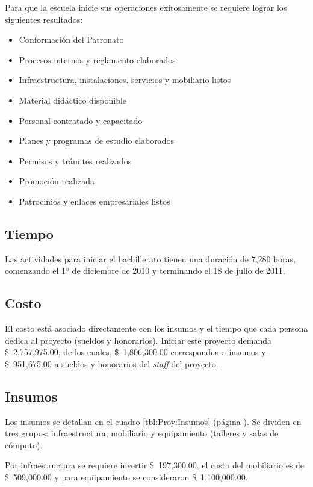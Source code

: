 Para que la escuela inicie sus operaciones exitosamente se requiere lograr los siguientes resultados:

\begin{itemize}
	\item Conformación del Patronato
	\item Procesos internos y reglamento elaborados
	\item Infraestructura, instalaciones. servicios y mobiliario listos
	\item Material didáctico disponible
	\item Personal contratado y capacitado
	\item Planes y programas de estudio elaborados
	\item Permisos y trámites realizados
	\item Promoción realizada
	\item Patrocinios y enlaces empresariales listos
\end{itemize}

\subsection{Tiempo}

Las actividades para iniciar el bachillerato tienen una duración de 7,280 horas, comenzando el 1º de diciembre de 2010 y terminando el 18 de julio  de 2011.

\subsection{Costo}
\label{sub:Proy:Costo}

El costo está asociado directamente con los insumos y el tiempo que cada persona dedica al proyecto (sueldos y honorarios). Iniciar este proyecto demanda \$~2,757,975.00; de los cuales, \$~1,806,300.00 corresponden a insumos y \$~951,675.00 a sueldos y honorarios del \emph{staff} del proyecto.

\subsection{Insumos}

Los insumos se detallan en el cuadro \ref{tbl:Proy:Insumos} (página \pageref{tbl:Proy:Insumos}). Se dividen en tres grupos: infraestructura, mobiliario y equipamiento (talleres y salas de cómputo).

Por infraestructura se requiere invertir \$~197,300.00, el costo del mobiliario es de \$~509,000.00 y para equipamiento se consideraron \$~1,100,000.00.

